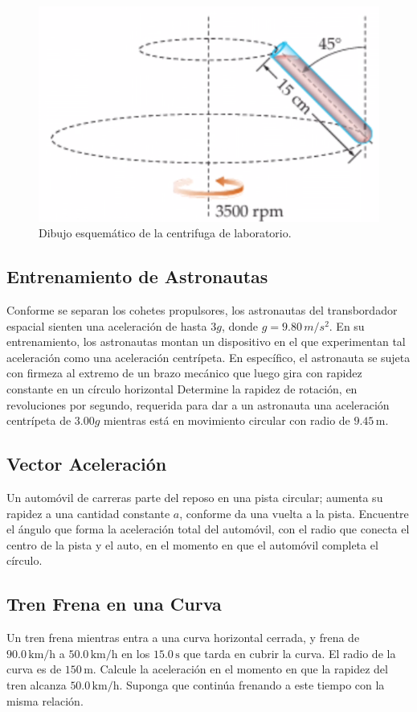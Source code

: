 \documentclass{replab}
\begin{document}
\begin{figure}[htbp]
	\centering
	\includegraphics[width=.4\columnwidth]{imagenes/centrifuga.png}
	\caption{Dibujo esquemático de la centrifuga de laboratorio.}
	\label{fig:centrifuga}
\end{figure}
	

\subsection{Entrenamiento de Astronautas}
Conforme se separan los cohetes propulsores, los astronautas del transbordador espacial sienten una aceleración de hasta $3g$, donde $g = 9.80\,m/s^2$. En su entrenamiento, los astronautas montan un dispositivo en el que experimentan tal aceleración como una aceleración centrípeta. En específico, el astronauta se sujeta con firmeza al extremo de un brazo mecánico que luego gira con rapidez constante en un círculo horizontal Determine la rapidez de rotación, en revoluciones por segundo, requerida para dar a un astronauta una aceleración centrípeta de $3.00g$ mientras está en movimiento circular con radio de $9.45\,\text{m}$.


\subsection{Vector Aceleración}
Un automóvil de carreras parte del reposo en una pista circular; aumenta su rapidez a una cantidad constante $a$, conforme da una vuelta a la pista. Encuentre el ángulo que forma la aceleración total del automóvil, con el radio que conecta el centro de la pista y el auto, en el momento en que el automóvil completa el círculo.

\subsection{Tren Frena en una Curva}
Un tren frena mientras entra a una curva horizontal cerrada, y frena de $90.0\,\text{km/h}$ a $50.0\,\text{km/h}$ en los $15.0\,\text{s}$ que tarda en cubrir la curva. El radio de la curva es de $150\,\text{m}$. Calcule la aceleración en el momento en que la rapidez del tren alcanza $50.0\,\text{km/h}$. Suponga que continúa frenando a este tiempo con la misma relación.
\end{document}
